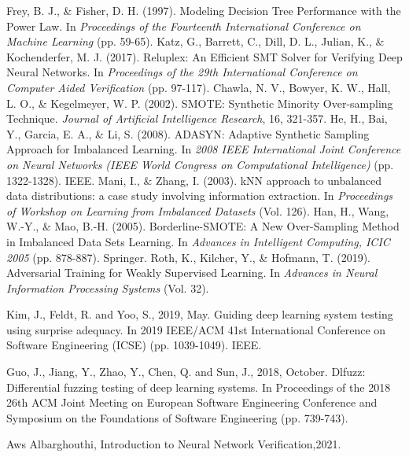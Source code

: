 \begin{singlespace}
\begin{thebibliography}{}
     Frey, B. J., \& Fisher, D. H. (1997). Modeling Decision Tree Performance with the Power Law. In \textit{Proceedings of the Fourteenth International Conference on Machine Learning} (pp. 59-65).
     Katz, G., Barrett, C., Dill, D. L., Julian, K., \& Kochenderfer, M. J. (2017). Reluplex: An Efficient SMT Solver for Verifying Deep Neural Networks. In \textit{Proceedings of the 29th International Conference on Computer Aided Verification} (pp. 97-117).
     Chawla, N. V., Bowyer, K. W., Hall, L. O., \& Kegelmeyer, W. P. (2002). SMOTE: Synthetic Minority Over-sampling Technique. \textit{Journal of Artificial Intelligence Research}, 16, 321-357.
     He, H., Bai, Y., Garcia, E. A., \& Li, S. (2008). ADASYN: Adaptive Synthetic Sampling Approach for Imbalanced Learning. In \textit{2008 IEEE International Joint Conference on Neural Networks (IEEE World Congress on Computational Intelligence)} (pp. 1322-1328). IEEE.
     Mani, I., \& Zhang, I. (2003). kNN approach to unbalanced data distributions: a case study involving information extraction. In \textit{Proceedings of Workshop on Learning from Imbalanced Datasets} (Vol. 126).
     Han, H., Wang, W.-Y., \& Mao, B.-H. (2005). Borderline-SMOTE: A New Over-Sampling Method in Imbalanced Data Sets Learning. In \textit{Advances in Intelligent Computing, ICIC 2005} (pp. 878-887). Springer.
     Roth, K., Kilcher, Y., \& Hofmann, T. (2019). Adversarial Training for Weakly Supervised Learning. In \textit{Advances in Neural Information Processing Systems} (Vol. 32).


   
  
  


    Kim, J., Feldt, R. and Yoo, S., 2019, May. Guiding deep learning system testing using surprise adequacy. In 2019 IEEE/ACM 41st International Conference on Software Engineering (ICSE) (pp. 1039-1049). IEEE.
  
   
    Guo, J., Jiang, Y., Zhao, Y., Chen, Q. and Sun, J., 2018, October. Dlfuzz: Differential fuzzing testing of deep learning systems. In Proceedings of the 2018 26th ACM Joint Meeting on European Software Engineering Conference and Symposium on the Foundations of Software Engineering (pp. 739-743).





    Aws Albarghouthi, Introduction to Neural Network Verification,2021.
    

\end{thebibliography}
\end{singlespace}
